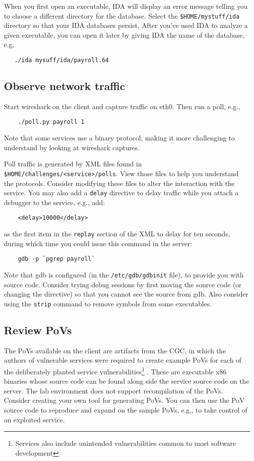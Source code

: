 {When you first open an executable, IDA will display an error message telling you to choose
a different directory for the database.  Select the {\tt \$HOME/mystuff/ida} directory so that your IDA
databases persist.  After you've used IDA to analyze a given executable, you can open it later
by giving IDA the name of the database, e.g,
\begin{verbatim}
   ./ida mysuff/ida/payroll.64
\end{verbatim}

\subsection{Observe network traffic}
Start wireshark on the client and capture traffic on eth0.  Then run a poll, e.g.,
\begin{verbatim}
    ./poll.py payroll 1
\end{verbatim}
\noindent Note that some services use a binary protocol, making it more challenging to understand
by looking at wireshark captures.

Poll traffic is generated by XML files found in {\tt \$HOME/challenges/<service>/polls}.   View those
files to help you understand the protocols.   Consider modifying these files to alter the interaction
with the service.  You may also add a {\tt delay} directive to delay traffic while you attach a debugger
to the service, e.g., add:
\begin{verbatim}
    <delay>10000</delay>
\end{verbatim}
\noindent as the first item in the {\tt replay} section of the XML to delay for ten seconds, during which time you could issue this command in the server:
\begin{verbatim}
    gdb -p `pgrep payroll`
\end{verbatim}

Note that gdb is configured (in the {\tt /etc/gdb/gdbinit} file), to provide you with source
code.  Consider trying debug sessions by first moving the source code (or changing the directive)
so that you cannot see the source from gdb.  Also consider using the {\tt strip} command to
remove symbols from some executables.

\subsection{Review PoVs}
The PoVs available on the client are artifacts from the CGC, in which the authors of vulnerable
services were required to create example PoVs for each of the deliberately planted service 
vulnerabilities\footnote{Services also include unintended vulnerabilities common to most
software development} .  These
are executable x86 binaries whose source code can be found along side the service source code on
the server.  The lab environment does not support recompilation of the PoVs.  Consider creating 
your own tool for generating PoVs.  You can then use the PoV source code to reproduce and expand
on the sample PoVs, e.g., to take control of an exploited service.

}
